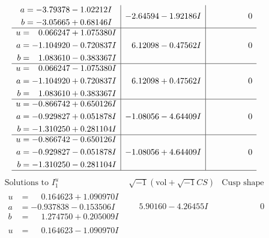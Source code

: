 \documentclass[1p]{elsarticle_modified}
\theoremstyle{definition}
\newcommand{\I}{\sqrt{-1}}
\begin{document}
$$\begin{array}{c|c|c}
\begin{aligned}
a &= -3.79378 - 1.02212 I \\
b &= -3.05665 + 0.68146 I\end{aligned}
 & -2.64594 - 1.92186 I & \phantom{-0.000000 } 0 \\ \hline\begin{aligned}
u &= \phantom{-}0.066247 + 1.075380 I \\
a &= -1.104920 - 0.720837 I \\
b &= \phantom{-}1.083610 - 0.383367 I\end{aligned}
 & \phantom{-}6.12098 - 0.47562 I & \phantom{-0.000000 } 0 \\ \hline\begin{aligned}
u &= \phantom{-}0.066247 - 1.075380 I \\
a &= -1.104920 + 0.720837 I \\
b &= \phantom{-}1.083610 + 0.383367 I\end{aligned}
 & \phantom{-}6.12098 + 0.47562 I & \phantom{-0.000000 } 0 \\ \hline\begin{aligned}
u &= -0.866742 + 0.650126 I \\
a &= -0.929827 + 0.051878 I \\
b &= -1.310250 + 0.281104 I\end{aligned}
 & -1.08056 - 4.64409 I & \phantom{-0.000000 } 0 \\ \hline\begin{aligned}
u &= -0.866742 - 0.650126 I \\
a &= -0.929827 - 0.051878 I \\
b &= -1.310250 - 0.281104 I\end{aligned}
 & -1.08056 + 4.64409 I & \phantom{-0.000000 } 0\\
 \hline 
 \end{array}$$\newpage$$\begin{array}{c|c|c}  
\text{Solutions to }I^u_{1}& \I (\text{vol} + \sqrt{-1}CS) & \text{Cusp shape}\\
 \hline 
\begin{aligned}
u &= \phantom{-}0.164623 + 1.090970 I \\
a &= -0.937838 - 0.153506 I \\
b &= \phantom{-}1.274750 + 0.205009 I\end{aligned}
 & \phantom{-}5.90160 - 4.26455 I & \phantom{-0.000000 } 0 \\ \hline\begin{aligned}
u &= \phantom{-}0.164623 - 1.090970 I \\

\end{aligned}
\end{array}$$
\end{document}
